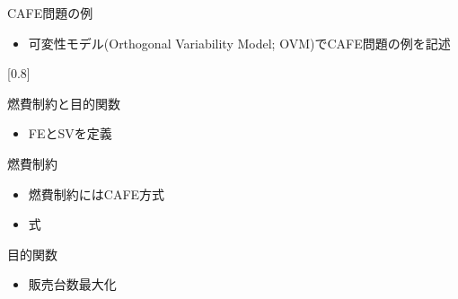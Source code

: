\documentclass[dvipdfmx, 11pt]{beamer}
\begin{document}
\begin{frame}{CAFE問題の例}
 \begin{itemize}
  \item 可変性モデル(Orthogonal Variability Model; OVM)でCAFE問題の例を記述
 \end{itemize}
 \scalebox{0.8}[0.8]{%
  
 }
\end{frame}
\begin{frame}{燃費制約と目的関数}
 \begin{itemize}
  \item FEとSVを定義
 \end{itemize}
 \begin{block}{燃費制約}
  \begin{itemize}
   \item 燃費制約にはCAFE方式
   \item 式
  \end{itemize} 
 \end{block}
 \begin{block}{目的関数}
  \begin{itemize}
   \item 販売台数最大化
  \end{itemize}
 \end{block}
\end{frame}
\end{document}
